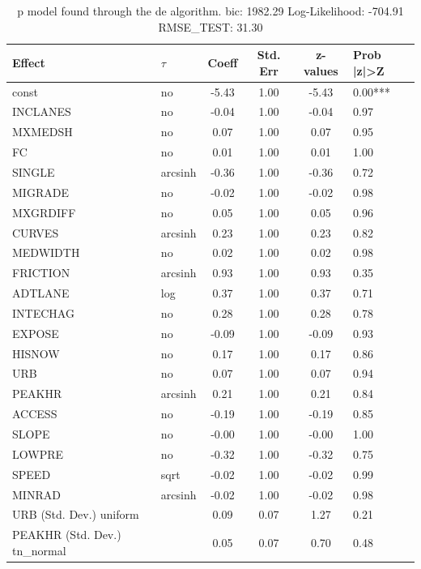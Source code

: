 \begin{table}
	\caption{p model found through the de algorithm. bic: 1982.29 Log-Likelihood: -704.91 RMSE_TEST: 31.30}
	\begin{center}
		\begin{tabular}{|l|l|c|c|c|l|}
			\hline
			Effect & $\tau$ & Coeff & Std. Err & z-values & Prob |z|>Z \\
			\hline
			const & no & -5.43 & 1.00 & -5.43 & 0.00*** \\
			\hline
			INCLANES & no & -0.04 & 1.00 & -0.04 & 0.97 \\
			\hline
			MXMEDSH & no & 0.07 & 1.00 & 0.07 & 0.95 \\
			\hline
			FC & no & 0.01 & 1.00 & 0.01 & 1.00 \\
			\hline
			SINGLE & arcsinh & -0.36 & 1.00 & -0.36 & 0.72 \\
			\hline
			MIGRADE & no & -0.02 & 1.00 & -0.02 & 0.98 \\
			\hline
			MXGRDIFF & no & 0.05 & 1.00 & 0.05 & 0.96 \\
			\hline
			CURVES & arcsinh & 0.23 & 1.00 & 0.23 & 0.82 \\
			\hline
			MEDWIDTH & no & 0.02 & 1.00 & 0.02 & 0.98 \\
			\hline
			FRICTION & arcsinh & 0.93 & 1.00 & 0.93 & 0.35 \\
			\hline
			ADTLANE & log & 0.37 & 1.00 & 0.37 & 0.71 \\
			\hline
			INTECHAG & no & 0.28 & 1.00 & 0.28 & 0.78 \\
			\hline
			EXPOSE & no & -0.09 & 1.00 & -0.09 & 0.93 \\
			\hline
			HISNOW & no & 0.17 & 1.00 & 0.17 & 0.86 \\
			\hline
			URB & no & 0.07 & 1.00 & 0.07 & 0.94 \\
			\hline
			PEAKHR & arcsinh & 0.21 & 1.00 & 0.21 & 0.84 \\
			\hline
			ACCESS & no & -0.19 & 1.00 & -0.19 & 0.85 \\
			\hline
			SLOPE & no & -0.00 & 1.00 & -0.00 & 1.00 \\
			\hline
			LOWPRE & no & -0.32 & 1.00 & -0.32 & 0.75 \\
			\hline
			SPEED & sqrt & -0.02 & 1.00 & -0.02 & 0.99 \\
			\hline
			MINRAD & arcsinh & -0.02 & 1.00 & -0.02 & 0.98 \\
			\hline
			URB (Std. Dev.) uniform &  & 0.09 & 0.07 & 1.27 & 0.21 \\
			\hline
			PEAKHR (Std. Dev.) tn_normal &  & 0.05 & 0.07 & 0.70 & 0.48 \\

\end{tabular}
\end{center}
\end{table}
